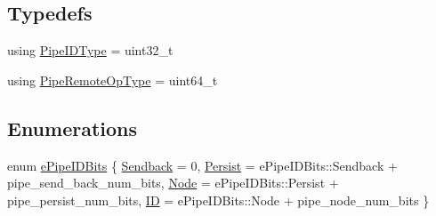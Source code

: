 \subsection*{Typedefs}
\begin{DoxyCompactItemize}
\item 
using \hyperlink{namespacevt_1_1pipe_a8aa7908de242917ac0922b9e9c85fea4}{Pipe\+I\+D\+Type} = uint32\+\_\+t
\item 
using \hyperlink{namespacevt_1_1pipe_a9f156f00d06693969d89a230a38eab52}{Pipe\+Remote\+Op\+Type} = uint64\+\_\+t
\end{DoxyCompactItemize}
\subsection*{Enumerations}
\begin{DoxyCompactItemize}
\item 
enum \hyperlink{namespacevt_1_1pipe_a21eef17afd7b326e3b65894dffa25901}{e\+Pipe\+I\+D\+Bits} \{ \hyperlink{namespacevt_1_1pipe_a21eef17afd7b326e3b65894dffa25901aaac42b3fdd37e9218dbd0e436d89267d}{Sendback} = 0, 
\hyperlink{namespacevt_1_1pipe_a21eef17afd7b326e3b65894dffa25901ac18837aff5b91489fb6ecd1d654c9fe6}{Persist} = e\+Pipe\+I\+D\+Bits\+:\+:Sendback + pipe\+\_\+send\+\_\+back\+\_\+num\+\_\+bits, 
\hyperlink{namespacevt_1_1pipe_a21eef17afd7b326e3b65894dffa25901ac0c297204ed447f62890997c285e167f}{Node} = e\+Pipe\+I\+D\+Bits\+:\+:Persist + pipe\+\_\+persist\+\_\+num\+\_\+bits, 
\hyperlink{namespacevt_1_1pipe_a21eef17afd7b326e3b65894dffa25901af10f264d6f5a73d3ea0c79b74f383933}{ID} = e\+Pipe\+I\+D\+Bits\+:\+:Node + pipe\+\_\+node\+\_\+num\+\_\+bits
 \}
\end{DoxyCompactItemize}
